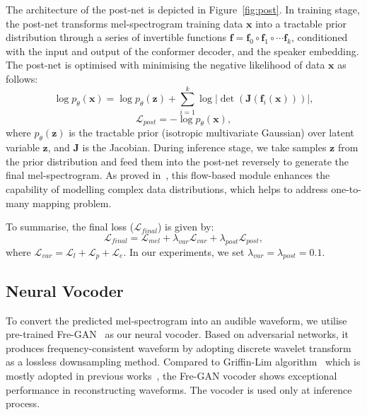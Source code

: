 \documentclass[letterpaper]{article} %
\begin{document}
The architecture of the post-net is depicted in Figure~\ref{fig:post}. In training stage, the post-net transforms mel-spectrogram training data $\boldsymbol{x}$ into a tractable prior distribution through a series of invertible functions $\mathbf{f}=\mathbf{f}_0\circ\mathbf{f}_1\circ\cdots\mathbf{f}_k$, conditioned with the input and output of the conformer decoder, and the speaker embedding. The post-net is optimised with minimising the negative likelihood of data $\boldsymbol{x}$ as follows:
\begin{equation}
\log p_{\theta}(\boldsymbol{x}) = \log p_{\theta}(\boldsymbol{z}) + \sum_{i=1}^{k}\log |\det(\boldsymbol{J}(\mathbf{f}_i(\boldsymbol{x})))|,
\end{equation}
\begin{equation}
\mathcal{L}_{post} = - \log p_{\theta}(\boldsymbol{x}),
\end{equation}
where $p_{\theta}(\boldsymbol{z})$ is the tractable prior (isotropic multivariate Gaussian) over latent variable $\boldsymbol{z}$, and $\boldsymbol{J}$ is the Jacobian. During inference stage, we take samples $\boldsymbol{z}$ from the prior distribution and feed them into the post-net reversely to generate the final mel-spectrogram. As proved in~\cite{ren2022revisiting}, this flow-based module enhances the capability of modelling complex data distributions, which helps to address one-to-many mapping problem.

To summarise, the final loss ($\mathcal{L}_{final}$) is given by:
\begin{equation}
\mathcal{L}_{final} = \mathcal{L}_{mel} + \lambda_{var}\mathcal{L}_{var} + \lambda_{post}\mathcal{L}_{post},
\end{equation}
where $\mathcal{L}_{var}=\mathcal{L}_{l}+\mathcal{L}_{p}+\mathcal{L}_{e}$. In our experiments, we set $\lambda_{var} = \lambda_{post} = 0.1$.

\subsection{Neural Vocoder}
To convert the predicted mel-spectrogram into an audible waveform, we utilise pre-trained Fre-GAN~\cite{kim21f_interspeech} as our neural vocoder. Based on adversarial networks, it produces frequency-consistent waveform by adopting discrete wavelet transform~\cite{daubechies1988orthonormal} as a lossless downsampling method. Compared to Griffin-Lim algorithm~\cite{griffin1984signal} which is mostly adopted in previous works~\cite{kim2021lip,he2022flow,kim2023lip}, the Fre-GAN vocoder shows exceptional performance in reconstructing waveforms.
The vocoder is used only at inference process.
\end{document}
